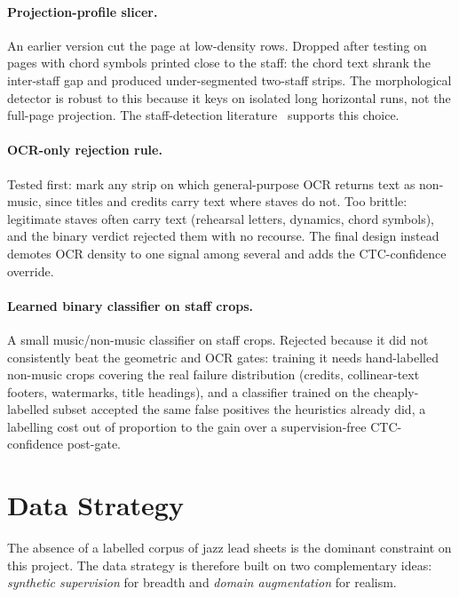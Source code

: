 \paragraph{Projection-profile slicer.}
An earlier version cut the page at low-density rows. Dropped after
testing on pages with chord symbols printed close to the staff: the
chord text shrank the inter-staff gap and produced under-segmented
two-staff strips. The morphological detector is robust to this because
it keys on isolated long horizontal runs, not the full-page
projection. The staff-detection
literature~\cite{dalitzComparativeStudyStaff2008} supports this choice.

\paragraph{OCR-only rejection rule.}
Tested first: mark any strip on which general-purpose OCR returns text
as non-music, since titles and credits carry text where staves do not.
Too brittle: legitimate staves often carry text (rehearsal letters,
dynamics, chord symbols), and the binary verdict rejected them with no
recourse. The final design instead demotes OCR density to one signal
among several and adds the CTC-confidence override.

\paragraph{Learned binary classifier on staff crops.}
A small music/non-music classifier on staff crops. Rejected because it
did not consistently beat the geometric and OCR gates: training it
needs hand-labelled non-music crops covering the real failure
distribution (credits, collinear-text footers, watermarks, title
headings), and a classifier trained on the cheaply-labelled subset
accepted the same false positives the heuristics already did, a
labelling cost out of proportion to the gain over a supervision-free
CTC-confidence post-gate.

\section{Data Strategy}
\label{sec:design-data}

The absence of a labelled corpus of jazz lead sheets is the dominant
constraint on this project.
The data strategy is therefore built on two complementary ideas:
\textit{synthetic supervision} for breadth and \textit{domain
augmentation} for realism.

